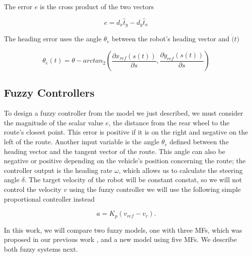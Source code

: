 \documentclass[symmetry,article,submit,moreauthors,pdftex]{Definitions/mdpi}
\begin{document}
The error $e$ is the cross product of the two vectors

\begin{equation}
e = d_x \hat{t}_y - d_y \hat{t}_x
\end{equation}

The heading error uses the angle $\theta_e$ between the robot's heading vector
and $\dot(t)$

\begin{equation}
\theta_e(t) = \theta - arctan_2 \left( \frac{\partial x_{ref}(s(t))}{\partial s} , \frac{\partial y_{ref}(s(t))}{\partial s} \right)
\end{equation}





\subsection{Fuzzy Controllers}%
    \label{sub:FuzzyControllers}

To design a fuzzy controller from the model we just described, we must consider
the magnitude of the scalar value $e$, the distance from the rear wheel to the
route's closest point. This error is positive if it is on the right and
negative on the left of the route. Another input variable is the angle
$\theta_e$ defined between the heading vector and the tangent vector of the
route. This angle can also be negative or positive depending on the vehicle's
position concerning the route; the controller output is the heading rate
$\omega$, which allows us to calculate the steering angle $\delta$. The target
velocity of the robot will be constant constat, so we will not control the
velocity $v$ using the fuzzy controller we will use the following simple
proportional controller instead     

\begin{equation}
    a = K_p(v_{ref}-v_r).
\end{equation}

In this work, we will compare two fuzzy models, one with three MFs, which was
proposed in our previous work \cite{Mancilla2021}, and a new model using five
MFs. We describe both fuzzy systems next.
\end{document}
